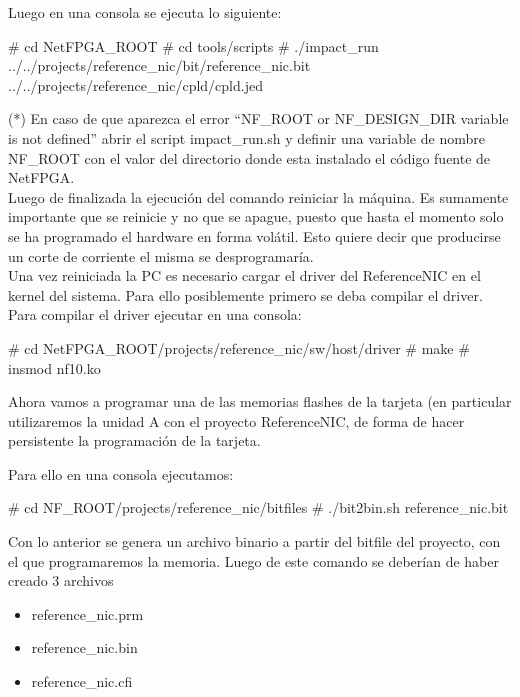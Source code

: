 Luego en una consola se ejecuta lo siguiente:

\begin{bash}
# cd NetFPGA_ROOT
# cd tools/scripts
# ./impact_run 
  ../../projects/reference_nic/bit/reference_nic.bit 
  ../../projects/reference_nic/cpld/cpld.jed 
\end{bash}

(*) En caso de que aparezca el error “NF\_ROOT or NF\_DESIGN\_DIR variable is not defined”
abrir el script impact\_run.sh y definir una variable de nombre NF\_ROOT con el valor del directorio donde esta instalado el código fuente de NetFPGA.\\

Luego de finalizada la ejecución del comando reiniciar la máquina. Es sumamente importante que se reinicie y no que se apague, puesto que hasta el momento solo se ha programado el hardware en forma volátil. Esto quiere decir que producirse un corte de corriente el misma se desprogramaría.\\

Una vez reiniciada la PC es necesario cargar el driver del ReferenceNIC en el kernel del sistema. Para ello posiblemente primero se deba compilar el driver. Para compilar el driver ejecutar en una consola:\\

\begin{bash}
# cd NetFPGA_ROOT/projects/reference_nic/sw/host/driver
# make
# insmod nf10.ko
\end{bash}

Ahora vamos a programar una de las memorias flashes de la tarjeta (en particular utilizaremos la unidad A con el proyecto ReferenceNIC, de forma de hacer persistente la programación de la tarjeta.

Para ello en una consola ejecutamos:

\begin{bash}
# cd NF_ROOT/projects/reference_nic/bitfiles
# ./bit2bin.sh reference_nic.bit
\end{bash}

Con lo anterior se genera un archivo binario a partir del bitfile del proyecto, con el que programaremos la memoria. Luego de este comando se deberían de haber creado 3 archivos

\begin{itemize}
\item reference\_nic.prm
\item reference\_nic.bin
\item reference\_nic.cfi
\end{itemize}

